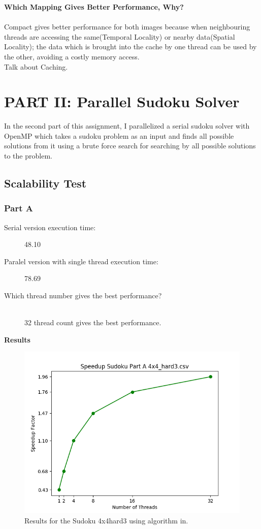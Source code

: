\documentclass{article}
\newcommand\tab[1][0.5cm]{\hspace*{#1}}
\begin{document}
\textbf{Which Mapping Gives Better Performance, Why?}\\
\\ \tab Compact gives better performance for both images because 
when neighbouring threads are accessing the same(Temporal Locality) or nearby data(Spatial Locality);
the data which is brought into the cache by one thread can be used 
by the other, avoiding a costly memory access.
\\ Talk about Caching.

\newpage

\section{PART II: Parallel Sudoku Solver}
\tab In the second part of this assignment, I parallelized a serial sudoku solver with OpenMP
which takes a sudoku problem as an input and finds all possible solutions from it 
using a brute force search for searching by all possible solutions to the problem. 

\subsection{Scalability Test}
\subsubsection{Part A}
\begin{description}
\item[Serial version execution time: ] 48.10
\item[Paralel version with single thread execution time: ] 78.69
\item[Which thread number gives the best performance?]\hfill \\
32 thread count gives the best performance.
\end{description} 

\textbf{Results}
 \begin{figure}[!htb]
    \centering
        \includegraphics[width=0.8\linewidth]{./img/speedup_part_2_A.png}
        \caption{\small Results for the Sudoku 4x4hard3 using algorithm in.}
\end{figure}                
\end{document}
